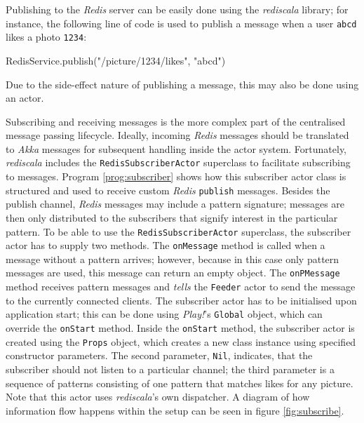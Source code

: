 Publishing to the \textit{Redis} server can be easily done using the \textit{rediscala} library; for instance, the following line of code is used to publish a message when a user \texttt{abcd} likes a photo \texttt{1234}:
\begin{JavaCode}
RedisService.publish("/picture/1234/likes", "abcd")
\end{JavaCode}
Due to the side-effect nature of publishing a message, this may also be done using an actor. 

Subscribing and receiving messages is the more complex part of the centralised message passing lifecycle. Ideally, incoming \textit{Redis} messages should be translated to \textit{Akka} messages for subsequent handling inside the actor system. Fortunately, \textit{rediscala} includes the \texttt{RedisSubscriberActor} superclass to facilitate subscribing to messages. Program \ref{prog:subscriber} shows how this subscriber actor class is structured and used to receive custom \textit{Redis} \texttt{publish} messages. Besides the publish channel, \textit{Redis} messages may include a pattern signature; messages are then only distributed to the subscribers that signify interest in the particular pattern. To be able to use the \texttt{RedisSubscriberActor} superclass, the subscriber actor has to supply two methods. The \texttt{onMessage} method is called when a message without a pattern arrives; however, because in this case only pattern messages are used, this message can return an empty object. The \texttt{onPMessage} method receives pattern messages and \textit{tells} the \texttt{Feeder} actor to send the message to the currently connected clients. The subscriber actor has to be initialised upon application start; this can be done using \textit{Play!}'s \texttt{Global} object, which can override the \texttt{onStart} method. Inside the \texttt{onStart} method, the subscriber actor is created using the \texttt{Props} object, which creates a new class instance using specified constructor parameters. The second parameter, \texttt{Nil}, indicates, that the subscriber should not listen to a particular channel; the third parameter is a sequence of patterns consisting of one pattern that matches likes for any picture. Note that this actor uses \textit{rediscala}'s own dispatcher. A diagram of how information flow happens within the setup can be seen in figure \ref{fig:subscribe}.

